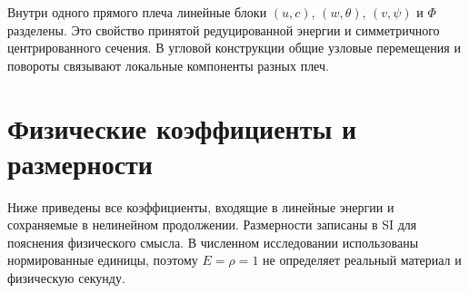 \documentclass[11pt,a4paper]{article}
\begin{document}
Внутри одного прямого плеча линейные блоки $(u,c)$, $(w,\theta)$, $(v,\psi)$ и $\Phi$ разделены. Это свойство принятой редуцированной энергии и симметричного центрированного сечения. В угловой конструкции общие узловые перемещения и повороты связывают локальные компоненты разных плеч.

\section{Физические коэффициенты и размерности}
Ниже приведены все коэффициенты, входящие в линейные энергии и сохраняемые в нелинейном продолжении. Размерности записаны в SI для пояснения физического смысла. В численном исследовании использованы нормированные единицы, поэтому $E=\rho=1$ не определяет реальный материал и физическую секунду.
\end{document}
